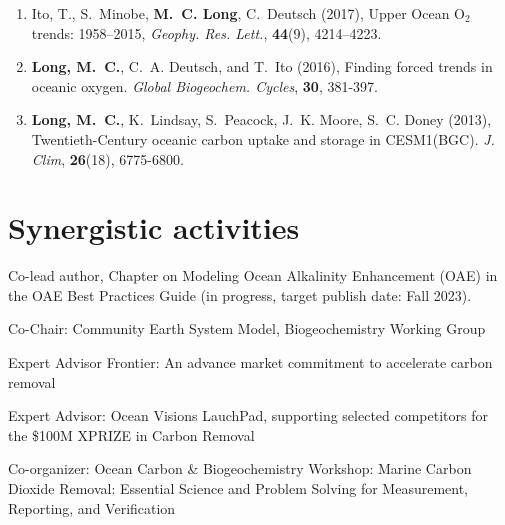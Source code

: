 \documentclass[12pt]{article}
\begin{document}
\begin{enumerate}[leftmargin=1.5em,font=\normalfont]
\item
Ito, T., S.~Minobe, \textbf{M.~C. Long}, C.~Deutsch (2017), {Upper Ocean O$_2$ trends: 1958--2015}, \textit{Geophy. Res. Lett.}, \textbf{44}(9), 4214--4223.

\item
\textbf{{Long}, M.~C.}, C.~A. {Deutsch}, and T.~Ito (2016), Finding forced trends in oceanic oxygen. \textit{Global Biogeochem. Cycles}, \textbf{30}, 381-397.

\item
\textbf{Long, M.~C.}, K.~Lindsay, S.~Peacock, J.~K. Moore, S.~C. Doney (2013), {Twentieth-Century oceanic carbon uptake and storage in CESM1(BGC)}. \textit{J. Clim}, \textbf{26}(18), 6775-6800.

\end{enumerate}

\section{Synergistic activities}

\begin{description}[style=multiline,leftmargin=2.8cm,font=\normalfont]
\setlength{\itemsep}{-0.3em}
\item[2023] Co-lead author, Chapter on Modeling Ocean Alkalinity Enhancement (OAE) in the OAE Best Practices Guide (in progress, target publish date: Fall 2023).
\item [2022--] Co-Chair: Community Earth System Model, Biogeochemistry Working Group

\item[2022--] Expert Advisor Frontier: An advance market commitment to accelerate carbon removal

\item[2022--] Expert Advisor: Ocean Visions LauchPad, supporting selected competitors for the \$100M XPRIZE in Carbon Removal

\item [2022] Co-organizer: Ocean Carbon \& Biogeochemistry Workshop: Marine Carbon Dioxide Removal: Essential Science and Problem Solving for Measurement, Reporting, and Verification

\end{description}
\end{document}
